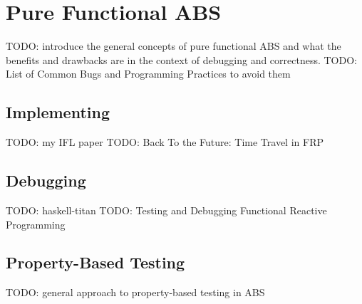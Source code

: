 \section{Pure Functional ABS}
TODO: introduce the general concepts of pure functional ABS and what the benefits and drawbacks are in the context of debugging and correctness. 
TODO: List of Common Bugs and Programming Practices to avoid them \cite{vipindeep_list_2005}

\subsection{Implementing}
TODO: my IFL paper
TODO: Back To the Future: Time Travel in FRP \cite{perez_back_2017}

\subsection{Debugging}
TODO: haskell-titan
TODO: Testing and Debugging Functional Reactive Programming \cite{perez_testing_2017}

\subsection{Property-Based Testing}
TODO: general approach to property-based testing in ABS